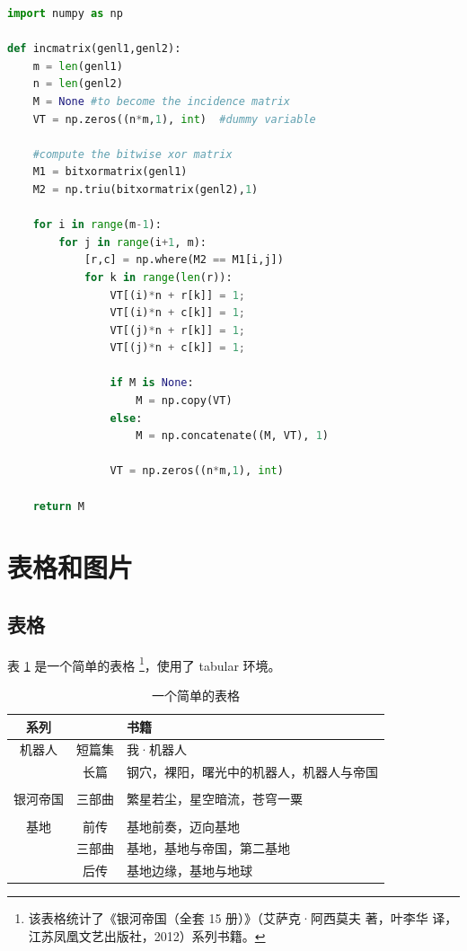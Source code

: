 \documentclass[12]{ctexart}
\begin{document}
\begin{lstlisting}[language=Python, caption={Python example}, label={lst_code}]
import numpy as np
    
def incmatrix(genl1,genl2):
    m = len(genl1)
    n = len(genl2)
    M = None #to become the incidence matrix
    VT = np.zeros((n*m,1), int)  #dummy variable
    
    #compute the bitwise xor matrix
    M1 = bitxormatrix(genl1)
    M2 = np.triu(bitxormatrix(genl2),1) 

    for i in range(m-1):
        for j in range(i+1, m):
            [r,c] = np.where(M2 == M1[i,j])
            for k in range(len(r)):
                VT[(i)*n + r[k]] = 1;
                VT[(i)*n + c[k]] = 1;
                VT[(j)*n + r[k]] = 1;
                VT[(j)*n + c[k]] = 1;
                
                if M is None:
                    M = np.copy(VT)
                else:
                    M = np.concatenate((M, VT), 1)
                
                VT = np.zeros((n*m,1), int)
    
    return M
\end{lstlisting}

\section{表格和图片}\label{sec_table_img}

\subsection{表格}

表 \ref{tab_simple} 是一个简单的表格 \footnote{该表格统计了《银河帝国（全套 15 册）》（艾萨克·阿西莫夫 著，叶李华 译，江苏凤凰文艺出版社，2012）系列书籍。}，使用了 tabular 环境。

\begin{table}[!ht]
    \centering
    \caption{一个简单的表格}
    \label{tab_simple}
    \begin{tabular}{ccl}
        \hline
        系列 & & 书籍 \\
        \hline
        机器人  & 短篇集 & 我·机器人 \\
               & 长篇 & 钢穴，裸阳，曙光中的机器人，机器人与帝国 \\
        \\
        银河帝国 & 三部曲 & 繁星若尘，星空暗流，苍穹一粟 \\
        \\
        基地 & 前传 & 基地前奏，迈向基地 \\
            & 三部曲 & 基地，基地与帝国，第二基地 \\
            & 后传 & 基地边缘，基地与地球\\
        \hline
    \end{tabular}
\end{table}
\end{document}
